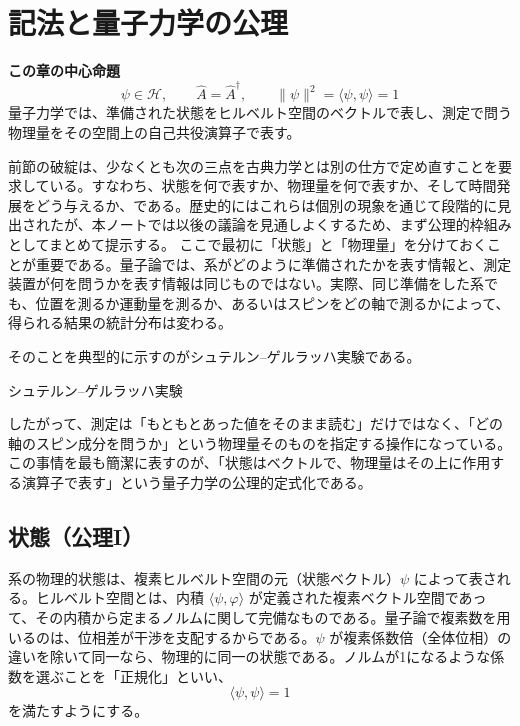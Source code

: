 \section{記法と量子力学の公理}

\noindent\textbf{この章の中心命題}
\[
\boxed{
\psi\in\mathcal{H},\qquad
\hat{A}=\hat{A}^\dagger,\qquad
\|\psi\|^2=\langle\psi,\psi\rangle=1
}
\]
量子力学では、準備された状態をヒルベルト空間のベクトルで表し、測定で問う物理量をその空間上の自己共役演算子で表す。

前節の破綻は、少なくとも次の三点を古典力学とは別の仕方で定め直すことを要求している。すなわち、状態を何で表すか、物理量を何で表すか、そして時間発展をどう与えるか、である。歴史的にはこれらは個別の現象を通じて段階的に見出されたが、本ノートでは以後の議論を見通しよくするため、まず公理的枠組みとしてまとめて提示する。
ここで最初に「状態」と「物理量」を分けておくことが重要である。量子論では、系がどのように準備されたかを表す情報と、測定装置が何を問うかを表す情報は同じものではない。実際、同じ準備をした系でも、位置を測るか運動量を測るか、あるいはスピンをどの軸で測るかによって、得られる結果の統計分布は変わる。

そのことを典型的に示すのがシュテルン--ゲルラッハ実験である。

\begin{experimentalfact}{シュテルン--ゲルラッハ実験}
\end{experimentalfact}

したがって、測定は「もともとあった値をそのまま読む」だけではなく、「どの軸のスピン成分を問うか」という物理量そのものを指定する操作になっている。この事情を最も簡潔に表すのが、「状態はベクトルで、物理量はその上に作用する演算子で表す」という量子力学の公理的定式化である。

\subsection{状態（公理I）}
系の物理的状態は、複素ヒルベルト空間の元（状態ベクトル）$\psi$ によって表される。ヒルベルト空間とは、内積 $\langle \psi,\varphi\rangle$ が定義された複素ベクトル空間であって、その内積から定まるノルムに関して完備なものである。量子論で複素数を用いるのは、位相差が干渉を支配するからである。$\psi$ が複素係数倍（全体位相）の違いを除いて同一なら、物理的に同一の状態である。ノルムが1になるような係数を選ぶことを「正規化」といい、
\[
\langle \psi,\psi\rangle =1
\]
を満たすようにする。

